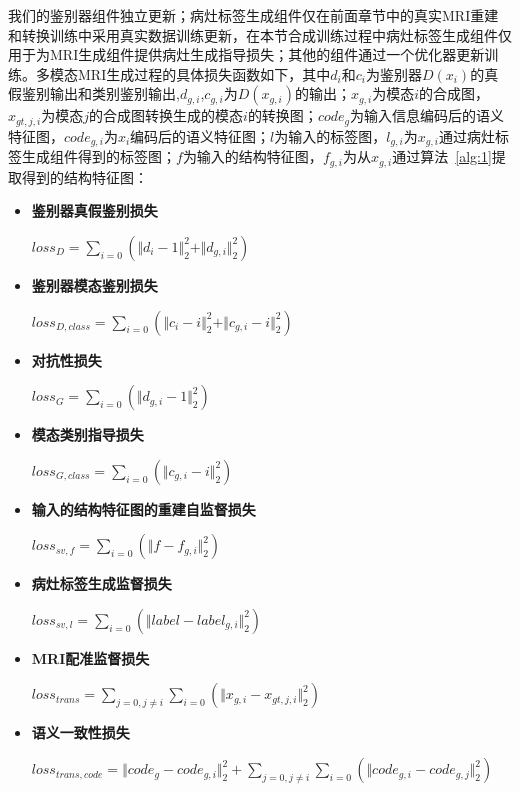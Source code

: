 \documentclass[letterpaper]{article} %
\begin{document}
我们的鉴别器组件独立更新；病灶标签生成组件仅在前面章节中的真实MRI重建和转换训练中采用真实数据训练更新，在本节合成训练过程中病灶标签生成组件仅用于为MRI生成组件提供病灶生成指导损失；其他的组件通过一个优化器更新训练。多模态MRI生成过程的具体损失函数如下，其中$d_{i}$和$c_{i}$为鉴别器$D(x_i)$的真假鉴别输出和类别鉴别输出,$d_{g,i}$,$c_{g,i}$为$D(x_{g,i})$的输出；$x_{g,i}$为模态$i$的合成图，$x_{gt,j,i}$为模态$j$的合成图转换生成的模态$i$的转换图；$code_g$为输入信息编码后的语义特征图，$code_{g,i}$为$x_i$编码后的语义特征图；$l$为输入的标签图，$l_{g,i}$为$x_{g,i}$通过病灶标签生成组件得到的标签图；$f$为输入的结构特征图，$f_{g,i}$为从$x_{g,i}$通过算法~\ref{alg:1}提取得到的结构特征图：

\begin{itemize}
	\item \textbf{鉴别器真假鉴别损失}
	\begin{center}
		$loss_{D}=\sum\limits_{i=0}(\Vert{d_{i}-1}\Vert_{2}^{2}+\Vert{d_{g,i}}\Vert_{2}^{2})$
	\end{center}

	\item \textbf{鉴别器模态鉴别损失}
	\begin{center}
	$loss_{D,class}=\sum\limits_{i=0}(\Vert{c_{i}-i}\Vert_{2}^{2}+\Vert{c_{g,i}-i}\Vert_{2}^{2})$
	\end{center}

	\item \textbf{对抗性损失}
	\begin{center}
		$loss_{G}=\sum\limits_{i=0}(\Vert{d_{g,i}-1}\Vert_{2}^{2})$
	\end{center}
	
	\item \textbf{模态类别指导损失}
	\begin{center}
		$loss_{G,class}=\sum\limits_{i=0}(\Vert{c_{g,i}-i}\Vert_{2}^{2})$
	\end{center}
	
	\item \textbf{输入的结构特征图的重建自监督损失}
	\begin{center}
		$loss_{sv,f}=\sum\limits_{i=0}(\Vert{f-f_{g,i}}\Vert_{2}^{2})$
	\end{center}
	
	\item \textbf{病灶标签生成监督损失}
	\begin{center}
		$loss_{sv,l}=\sum\limits_{i=0}(\Vert{label-label_{g,i}}\Vert_{2}^{2})$
	\end{center}
	
	\item \textbf{MRI配准监督损失}
	\begin{center}
		$loss_{trans}=\sum\limits_{j=0,j\neq i}\sum\limits_{i=0}(\Vert{x_{g,i}-x_{gt,j,i}}\Vert_{2}^{2})$
	\end{center}
	
	\item \textbf{语义一致性损失}
	\begin{center}
		$loss_{trans,code}=\Vert{code_g-code_{g,i}}\Vert_{2}^{2}+\sum\limits_{j=0,j\neq i}\sum\limits_{i=0}(\Vert{code_{g,i}-code_{g,j}}\Vert_{2}^{2})$
	\end{center}
	
\end{itemize}
\end{document}
